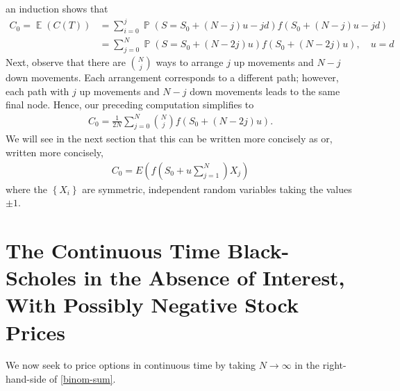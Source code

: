 \documentclass[12pt]{article}
\DeclareMathOperator{\ex}{\mathbb{E}}
\DeclareMathOperator{\prob}{\mathbb{P}}
\theoremstyle{plain}
\theoremstyle{definition}
\theoremstyle{remark}
\numberwithin{equation}{section}  %
\begin{document}
an induction shows that
\begin{equation*}
	\begin{split}
		C_{0} = \ex(C(T)) & =  \sum_{i = 0}^{j}\prob(S = S_{0} + (N-j)u - jd)
		f(S_{0} + (N-j)u - jd)
		\\
		& = \sum_{j = 0}^{N}\prob(S = S_{0} + (N-2j)u)
		f(S_{0} + (N-2j)u), \quad u = d
	\end{split}
\end{equation*}
Next, observe that there are $\binom{N}{j}$ ways to arrange $j$ up movements and
$N-j$ down movements. Each arrangement corresponds to a different path; however,
each path with $j$ up movements and $N-j$ down movements leads to the same final
node. Hence, our preceding computation simplifies to
\begin{equation}\label{binom-sum}
	\begin{split}
		C_{0} = 	\frac{1}{2N} \sum_{j = 0}^{N} {\binom{N}{j}}f(S_{0} + (N-2j)u).
	\end{split}
\end{equation}
We will see in the next section that this can be written more concisely as
or, written more concisely,
\begin{equation}
	\begin{split}
		C_{0} =  E(f(S_{0} + u \sum_{j=1}^{N})X_{j})	
	\end{split}
\end{equation}
where the $\left\{ X_{i} \right\}$ are symmetric, independent random 
variables taking the values $\pm 1$.

\section{The Continuous Time Black-Scholes in the Absence of Interest,
With Possibly Negative Stock Prices}
We now seek to price options in continuous time 
by taking $N \to \infty$ in the right-hand-side of \eqref{binom-sum}.
\end{document}
